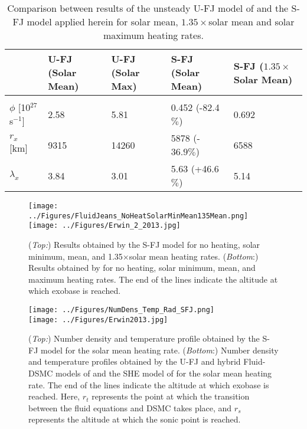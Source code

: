 \documentclass[times,12]{article}
\begin{document}
\begin{table}[h!]
\centering
\caption{Comparison between results of the unsteady U-FJ model of \cite{Erwin2013} and the S-FJ model applied herein for solar mean, $1.35 \times$solar mean and solar maximum heating rates.}
\begin{tabular}{lllll}
\hline
& U-FJ (Solar Mean) & U-FJ (Solar Max) & S-FJ (Solar Mean) & S-FJ ($1.35\times$Solar Mean)\\
\hline \vspace{-0.1in}\\
$\phi$ [10$^{27}$ s$^{-1}$] & 2.58 & 5.81 & 0.452 (-82.4$\%$) & 0.692 \\
$r_x$ [km] & 9315 & 14260 & 5878 (-$36.9\%$) & 6588\\
$\lambda_x$ & 3.84 & 3.01 & 5.63 (+46.6$\%$) & 5.14 \\
\hline
\end{tabular}
\label{tab:solarmeanmax}
\end{table}
\begin{figure}[h!]
\centering
\texttt{[image: ../Figures/FluidJeans\_NoHeatSolarMinMean135Mean.png]}\\
\texttt{[image: ../Figures/Erwin\_2\_2013.jpg]}
\caption{ (\textit{Top:}) Results obtained by the S-FJ model for no heating, solar minimum, mean, and 1.35$\times$solar mean heating rates. (\textit{Bottom}:) Results obtained by \cite{Erwin2013} for no heating, solar minimum, mean, and maximum heating rates. The end of the lines indicate the altitude at which exobase is reached.}
\label{fig:nominmean135mean}
\end{figure}
\begin{figure}[h!]
\centering
\texttt{[image: ../Figures/NumDens\_Temp\_Rad\_SFJ.png]}\\
\texttt{[image: ../Figures/Erwin2013.jpg]}
\caption{ (\textit{Top:}) Number density and temperature profile obtained by the S-FJ model for the solar mean heating rate. (\textit{Bottom}:)  Number density and temperature profiles obtained by the U-FJ and hybrid Fluid-DSMC models of \cite{Erwin2013} and the SHE model of \cite{Strobel2008} for the solar mean heating rate. The end of the lines indicate the altitude at which exobase is reached. Here, $r_t$ represents the point at which the transition between the fluid equations and DSMC takes place, and $r_s$ represents the altitude at which the sonic point is reached.}
\label{fig:SFJUFJStrobelDSMC}
\end{figure}
\pagebreak
\end{document}
